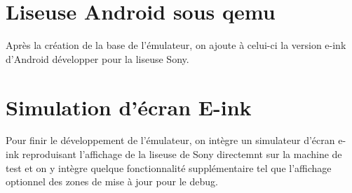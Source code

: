 \section{Liseuse Android sous qemu}

Après la création de la base de l'émulateur, on ajoute à celui-ci la version e-ink d'Android développer pour la liseuse Sony. 

\section{Simulation d'écran E-ink}

Pour finir le développement de l'émulateur, on intègre un simulateur d'écran e-ink reproduisant l'affichage de la liseuse de Sony directemnt sur la machine de test et on y intègre quelque fonctionnalité supplémentaire tel que l'affichage optionnel des zones de mise à jour pour le debug.